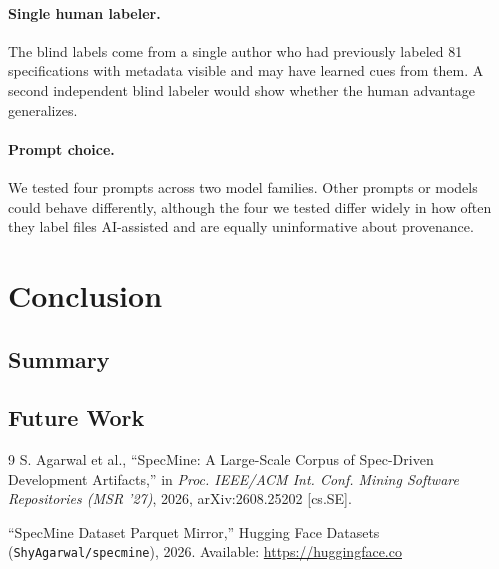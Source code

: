 \documentclass{article}
\begin{document}
\paragraph{Single human labeler.} The blind labels come from a single author who had previously labeled 81 specifications with metadata visible and may have learned cues from them. A second independent blind labeler would show whether the human advantage generalizes.

\paragraph{Prompt choice.} We tested four prompts across two model families. Other prompts or models could behave differently, although the four we tested differ widely in how often they label files AI-assisted and are equally uninformative about provenance.

\section{Conclusion}
\subsection{Summary}

\subsection{Future Work}

\begin{thebibliography}{9}
S. Agarwal et al., ``SpecMine: A Large-Scale Corpus of Spec-Driven Development Artifacts,'' in \textit{Proc. IEEE/ACM Int. Conf. Mining Software Repositories (MSR '27)}, 2026, arXiv:2608.25202 [cs.SE].

``SpecMine Dataset Parquet Mirror,'' Hugging Face Datasets (\texttt{ShyAgarwal/specmine}), 2026. Available: \url{https://huggingface.co}
\end{thebibliography}
\end{document}
